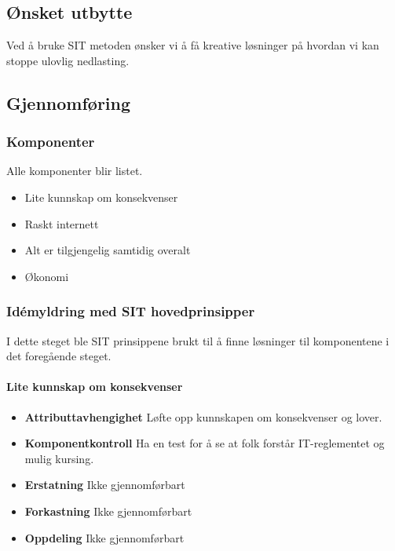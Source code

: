 \subsection{Ønsket utbytte}
Ved å bruke SIT metoden ønsker vi å få kreative løsninger på hvordan vi kan stoppe ulovlig nedlasting. 
\subsection{Gjennomføring}

\subsubsection{Komponenter} Alle komponenter blir listet.

\begin{itemize}
    \item Lite kunnskap om konsekvenser
    \item Raskt internett
    \item Alt er tilgjengelig samtidig overalt
    \item Økonomi
\end{itemize}

\subsubsection{Idémyldring med SIT hovedprinsipper} I dette steget ble SIT prinsippene brukt til å finne løsninger til komponentene i det foregående steget.

\paragraph{Lite kunnskap om konsekvenser}
\begin{itemize}
    \item \textbf{Attributtavhengighet} Løfte opp kunnskapen om konsekvenser og lover.
    \item \textbf{Komponentkontroll} Ha en test for å se at folk forstår IT-reglementet og mulig kursing.
    \item \textbf{Erstatning} Ikke gjennomførbart
    \item \textbf{Forkastning} Ikke gjennomførbart
    \item \textbf{Oppdeling} Ikke gjennomførbart
\end{itemize}

